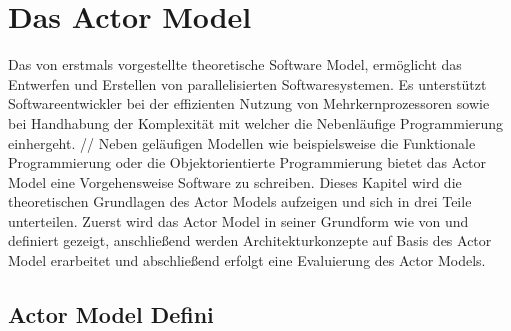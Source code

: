 \chapter{Das Actor Model}
Das von \cite{hewitt1973session} erstmals vorgestellte theoretische Software Model, ermöglicht das Entwerfen und Erstellen von parallelisierten Softwaresystemen. Es unterstützt Softwareentwickler bei der effizienten Nutzung von Mehrkernprozessoren sowie bei Handhabung der  Komplexität mit welcher die Nebenläufige Programmierung einhergeht.   //
Neben geläufigen Modellen wie beispielsweise die Funktionale Programmierung oder die Objektorientierte Programmierung bietet das Actor Model eine Vorgehensweise Software zu schreiben. Dieses Kapitel wird die theoretischen Grundlagen des Actor Models aufzeigen und sich in drei Teile unterteilen. Zuerst wird das Actor Model in seiner Grundform wie von \cite{hewitt1973session} und \cite{Agha1985ActorsSystems} definiert gezeigt, anschließend werden Architekturkonzepte auf Basis des Actor Model erarbeitet und abschließend erfolgt eine Evaluierung des Actor Models.

\section{Actor Model Defini}
